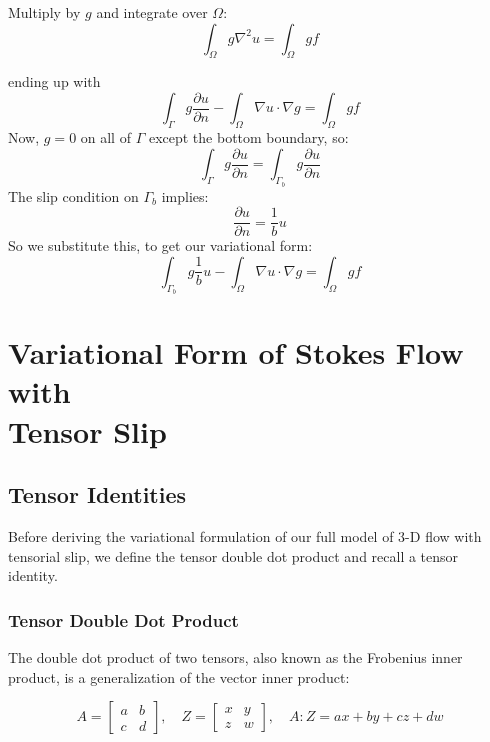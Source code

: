 \documentclass[12pt, a4paper, twoside, openright]{book}
\begin{document}
Multiply  by $g$ and integrate over $\Omega$:
\begin{equation}
\int_{\Omega} g \nabla^2 u = \int_{\Omega} g f
\end{equation}

ending up with
\begin{equation}
\int_{\Gamma} g \frac{\partial u}{\partial n}
 - \int_{\Omega} \nabla u \cdot \nabla g  
= \int_{\Omega} g f
\end{equation}
Now, $g=0$ on all of $\Gamma$ except the bottom boundary, so:
\begin{equation}
\int_{\Gamma} g \frac{\partial u}{\partial n}
= \int_{\Gamma_b} g \frac{\partial u}{\partial n}
\end{equation}
The slip condition on $\Gamma_b$ implies:
\begin{equation}
\frac{\partial u}{\partial n} = \frac{1}{b}u
\end{equation}
So we substitute this, to get our variational form:
\begin{equation}
\int_{\Gamma_b} g \frac{1}{b} u 
 - \int_{\Omega} \nabla u \cdot \nabla g  
= \int_{\Omega} g f
\end{equation}

\clearpage
\section{Variational Form of Stokes Flow with\\ Tensor Slip}

\subsection{Tensor Identities}

Before deriving the variational formulation of our full model of 3-D flow with tensorial slip, we define the tensor double dot product and recall a tensor identity.

\subsubsection{Tensor Double Dot Product}

The double dot product of two tensors, also known as the Frobenius inner product, is a generalization of the vector inner product:

\begin{equation}
A = 
\begin{bmatrix}
a & b \\
c & d
\end{bmatrix}
, \quad Z = 
\begin{bmatrix}
x & y \\
z & w
\end{bmatrix}
, \quad
A:Z = ax + by + cz + dw
\end{equation}
\end{document}
